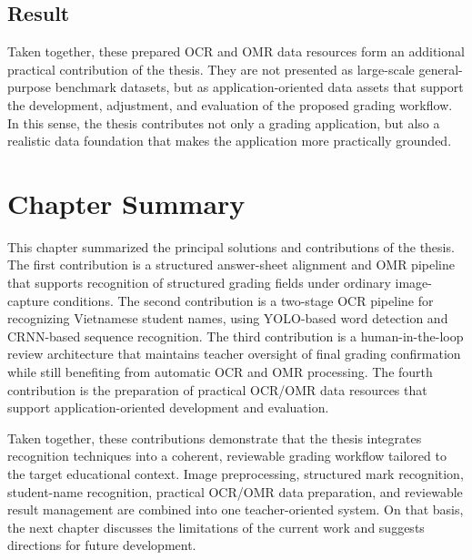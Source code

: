 \documentclass[../Main.tex]{subfiles}
\begin{document}
\subsection{Result}
\label{subsection:5.4.3}

Taken together, these prepared OCR and OMR data resources form an additional
practical contribution of the thesis. They are not presented as large-scale
general-purpose benchmark datasets, but as application-oriented data assets
that support the development, adjustment, and evaluation of the proposed
grading workflow. In this sense, the thesis contributes not only a grading
application, but also a realistic data foundation that makes the application
more practically grounded.

\section{Chapter Summary}
\label{section:5.5}

This chapter summarized the principal solutions and contributions of the thesis. The first contribution is a structured answer-sheet alignment and OMR pipeline that supports recognition of structured grading fields under ordinary image-capture conditions. The second contribution is a two-stage OCR pipeline for recognizing Vietnamese student names, using YOLO-based word detection and CRNN-based sequence recognition. The third contribution is a human-in-the-loop review architecture that maintains teacher oversight of final grading confirmation while still benefiting from automatic OCR and OMR processing. The fourth contribution is the preparation of practical OCR/OMR data resources that support application-oriented development and evaluation.

Taken together, these contributions demonstrate that the thesis integrates recognition techniques into a coherent, reviewable grading workflow tailored to the target educational context. Image preprocessing, structured mark recognition, student-name recognition, practical OCR/OMR data preparation, and reviewable result management are combined into one teacher-oriented system. On that basis, the next chapter discusses the limitations of the current work and suggests directions for future development.
\end{document}
